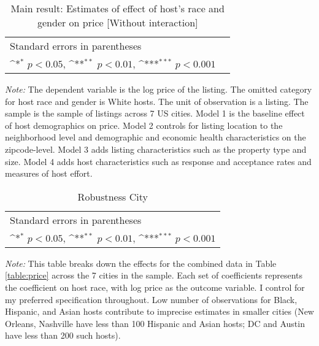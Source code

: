 \begin{table}[htbp]\centering
	\def\sym#1{\ifmmode^{#1}\else\(^{#1}\)\fi}
	\caption{Main result: Estimates of effect of host’s race and gender on price [Without interaction]}
	\begin{tabular}{l*{5}{c}}
		\hline\hline
		
		\hline\hline
		\multicolumn{5}{l}{\footnotesize Standard errors in parentheses}\\
		\multicolumn{5}{l}{\footnotesize \sym{*} \(p<0.05\), \sym{**} \(p<0.01\), \sym{***} \(p<0.001\)}\\
	\end{tabular}
	\label{table:price_no_int}
	\begin{tablenotes}
		
		\item {\it Note:} The dependent variable is the log price of the listing. The omitted category for host race and gender is White hosts. The unit of observation is a listing. The sample is the sample of listings across 7 US cities. Model 1 is the baseline effect of host demographics on price. Model 2 controls for listing location to the neighborhood level and demographic and economic health characteristics on the zipcode-level. Model 3 adds listing characteristics such as the property type and size. Model 4 adds host characteristics such as response and acceptance rates and measures of host effort.  
	\end{tablenotes}
\end{table}

\begin{table}[htbp]\centering
	\def\sym#1{\ifmmode^{#1}\else\(^{#1}\)\fi}
	\caption{Robustness City}
	\begin{tabular}{l*{7}{c}}
		\hline\hline
		
		\hline\hline
		\multicolumn{8}{l}{\footnotesize Standard errors in parentheses}\\
		\multicolumn{8}{l}{\footnotesize \sym{*} \(p<0.05\), \sym{**} \(p<0.01\), \sym{***} \(p<0.001\)}\\
	\end{tabular}
	\label{table:robustness_city_int}
	\begin{tablenotes}
	
			\item {\it Note:} This table breaks down the effects for the combined data in Table \ref{table:price} across the 7 cities in the sample. Each set of coefficients represents the coefficient on host race, with log price as the outcome variable. I control for my preferred specification throughout. Low number of observations for Black, Hispanic, and Asian hosts contribute to imprecise estimates in smaller cities (New Orleans, Nashville have less than 100 Hispanic and Asian hosts; DC and Austin have less than 200 such hosts). 
	\end{tablenotes}
\end{table}


